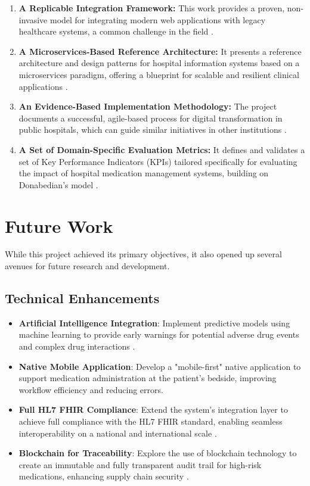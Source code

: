 \begin{enumerate}
    \item \textbf{A Replicable Integration Framework:} This work provides a proven, non-invasive model for integrating modern web applications with legacy healthcare systems, a common challenge in the field \cite{keasberry2017}.
    \item \textbf{A Microservices-Based Reference Architecture:} It presents a reference architecture and design patterns for hospital information systems based on a microservices paradigm, offering a blueprint for scalable and resilient clinical applications \cite{newman2021}.
    \item \textbf{An Evidence-Based Implementation Methodology:} The project documents a successful, agile-based process for digital transformation in public hospitals, which can guide similar initiatives in other institutions \cite{may2013}.
    \item \textbf{A Set of Domain-Specific Evaluation Metrics:} It defines and validates a set of Key Performance Indicators (KPIs) tailored specifically for evaluating the impact of hospital medication management systems, building on Donabedian's model \cite{donabedian1988}.
\end{enumerate}

\section{Future Work}

While this project achieved its primary objectives, it also opened up several avenues for future research and development.

\subsection{Technical Enhancements}

\begin{itemize}
    \item \textbf{Artificial Intelligence Integration}: Implement predictive models using machine learning to provide early warnings for potential adverse drug events and complex drug interactions \cite{bates2021,zhao2021}.
    \item \textbf{Native Mobile Application}: Develop a "mobile-first" native application to support medication administration at the patient's bedside, improving workflow efficiency and reducing errors.
    \item \textbf{Full HL7 FHIR Compliance}: Extend the system's integration layer to achieve full compliance with the HL7 FHIR standard, enabling seamless interoperability on a national and international scale \cite{mandl2020}.
    \item \textbf{Blockchain for Traceability}: Explore the use of blockchain technology to create an immutable and fully transparent audit trail for high-risk medications, enhancing supply chain security \cite{franzoso2014}.
\end{itemize}

